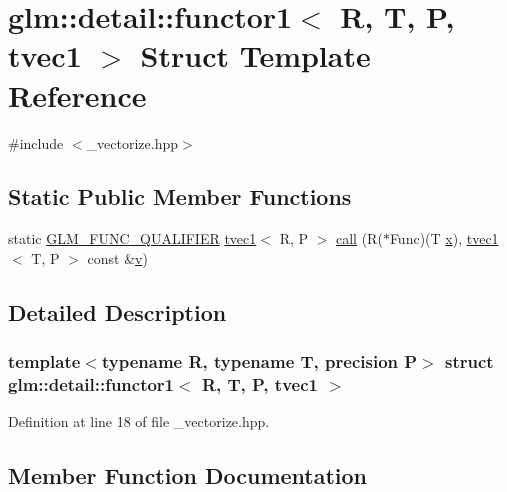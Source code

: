 \hypertarget{structglm_1_1detail_1_1functor1_3_01_r_00_01_t_00_01_p_00_01tvec1_01_4}{}\section{glm\+::detail\+::functor1$<$ R, T, P, tvec1 $>$ Struct Template Reference}
\label{structglm_1_1detail_1_1functor1_3_01_r_00_01_t_00_01_p_00_01tvec1_01_4}


{\ttfamily \#include $<$\+\_\+vectorize.\+hpp$>$}

\subsection*{Static Public Member Functions}
\begin{DoxyCompactItemize}
\item 
static \mbox{\hyperlink{setup_8hpp_a33fdea6f91c5f834105f7415e2a64407}{G\+L\+M\+\_\+\+F\+U\+N\+C\+\_\+\+Q\+U\+A\+L\+I\+F\+I\+ER}} \mbox{\hyperlink{structglm_1_1tvec1}{tvec1}}$<$ R, P $>$ \mbox{\hyperlink{structglm_1_1detail_1_1functor1_3_01_r_00_01_t_00_01_p_00_01tvec1_01_4_af5dd270c9695023917f2c43e61fa10e0}{call}} (R($\ast$Func)(T \mbox{\hyperlink{glad_8h_a92d0386e5c19fb81ea88c9f99644ab1d}{x}}), \mbox{\hyperlink{structglm_1_1tvec1}{tvec1}}$<$ T, P $>$ const \&\mbox{\hyperlink{glad_8h_a14cfbe2fc2234f5504618905b69d1e06}{v}})
\end{DoxyCompactItemize}


\subsection{Detailed Description}
\subsubsection*{template$<$typename R, typename T, precision P$>$\newline
struct glm\+::detail\+::functor1$<$ R, T, P, tvec1 $>$}



Definition at line 18 of file \+\_\+vectorize.\+hpp.



\subsection{Member Function Documentation}
\mbox{\label{structglm_1_1detail_1_1functor1_3_01_r_00_01_t_00_01_p_00_01tvec1_01_4_af5dd270c9695023917f2c43e61fa10e0}} 
